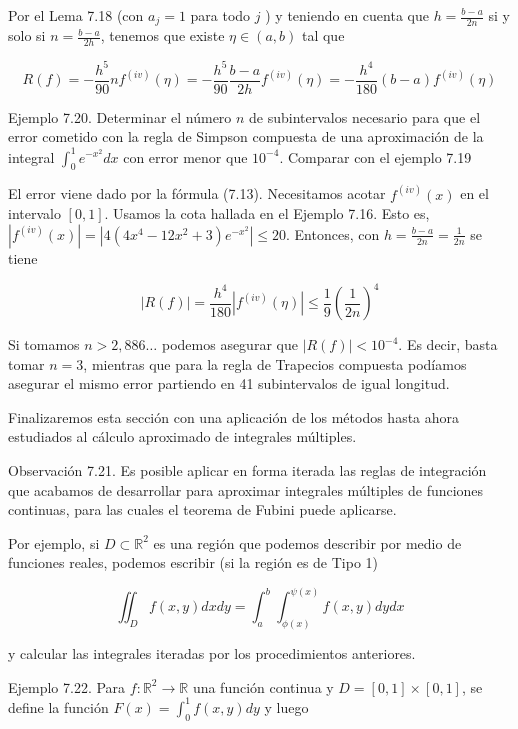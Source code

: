 \documentclass[10pt]{article}
\begin{document}
Por el Lema 7.18 (con $a_{j}=1$ para todo $j$ ) y teniendo en cuenta que $h=\frac{b-a}{2 n}$ si y solo si $n=\frac{b-a}{2 h}$, tenemos que existe $\eta \in(a, b)$ tal que


\begin{equation*}
R(f)=-\frac{h^{5}}{90} n f^{(i v)}(\eta)=-\frac{h^{5}}{90} \frac{b-a}{2 h} f^{(i v)}(\eta)=-\frac{h^{4}}{180}(b-a) f^{(i v)}(\eta) \tag{7.13}
\end{equation*}


Ejemplo 7.20. Determinar el número $n$ de subintervalos necesario para que el error cometido con la regla de Simpson compuesta de una aproximación de la integral $\int_{0}^{1} e^{-x^{2}} d x$ con error menor que $10^{-4}$. Comparar con el ejemplo 7.19

El error viene dado por la fórmula (7.13). Necesitamos acotar $f^{(i v)}(x)$ en el intervalo $[0,1]$. Usamos la cota hallada en el Ejemplo 7.16. Esto es, $\left|f^{(i v)}(x)\right|=\left|4\left(4 x^{4}-12 x^{2}+3\right) e^{-x^{2}}\right| \leq 20$. Entonces, con $h=\frac{b-a}{2 n}=\frac{1}{2 n}$ se tiene

$$
|R(f)|=\frac{h^{4}}{180}\left|f^{(i v)}(\eta)\right| \leq \frac{1}{9}\left(\frac{1}{2 n}\right)^{4}
$$

Si tomamos $n>2,886 \ldots$ podemos asegurar que $|R(f)|<10^{-4}$. Es decir, basta tomar $n=3$, mientras que para la regla de Trapecios compuesta podíamos asegurar el mismo error partiendo en 41 subintervalos de igual longitud.

Finalizaremos esta sección con una aplicación de los métodos hasta ahora estudiados al cálculo aproximado de integrales múltiples.

Observación 7.21. Es posible aplicar en forma iterada las reglas de integración que acabamos de desarrollar para aproximar integrales múltiples de funciones continuas, para las cuales el teorema de Fubini puede aplicarse.

Por ejemplo, si $D \subset \mathbb{R}^{2}$ es una región que podemos describir por medio de funciones reales, podemos escribir (si la región es de Tipo 1)

$$
\iint_{D} f(x, y) d x d y=\int_{a}^{b} \int_{\phi(x)}^{\psi(x)} f(x, y) d y d x
$$

y calcular las integrales iteradas por los procedimientos anteriores.

Ejemplo 7.22. Para $f: \mathbb{R}^{2} \rightarrow \mathbb{R}$ una función continua y $D=[0,1] \times[0,1]$, se define la función $F(x)=\int_{0}^{1} f(x, y) d y$ y luego
\end{document}
